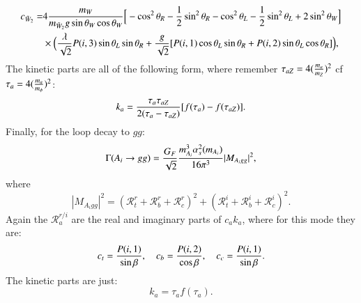 \documentclass[final,3p,times]{elsarticle}
\begin{document}
\begin{equation}
\begin{aligned}
c_{\tilde{W}_2} = & 4{m_{W} \over m_{\tilde{W}_2} g \sin\theta_W \cos\theta_W}\Big[-\cos^2 \theta_R - {1 \over 2}\sin^2 \theta_R - \cos^2 \theta_L - {1 \over 2}\sin^2 \theta_L + 2\sin^2 \theta_W\Big] \\ & \times \Big({\lambda \over \sqrt{2}}P(i,3)\sin\theta_L \sin\theta_R + {g \over \sqrt{2}}[P(i,1)\cos\theta_L \sin\theta_R + P(i,2)\sin\theta_L \cos\theta_R]\Big),
\end{aligned}
\end{equation}
The kinetic parts are all of the following form, where remember $\tau_{aZ} = 4({m_{a} \over m_{Z}})^2$ cf $\tau_{a} = 4({m_{a} \over m_{\phi}})^2$:
\begin{equation}
k_{a} = {\tau_{a}\tau_{aZ} \over 2(\tau_{a} - \tau_{aZ})}[f(\tau_{a})-f(\tau_{aZ})].
\end{equation}
Finally, for the loop decay to $gg$:
\begin{equation} \label{AggNMSSM}
\Gamma(A_i \rightarrow g g) = {G_{F} \over \sqrt{2}} {m_{A_i}^3 \alpha_s^2(m_{A_i}) \over 16 \pi^3} |M_{A_i gg}|^2,
\end{equation}
where 
\begin{equation}
|M_{A_i gg}|^2 = (\mathcal{R}_{t}^{r} + \mathcal{R}_{b}^{r} + \mathcal{R}_{c}^{r})^2 + (\mathcal{R}_{t}^{i} + \mathcal{R}_{b}^{i} + \mathcal{R}_{c}^{i})^2.
\end{equation}
Again the $\mathcal{R}_{a}^{r/i}$ are the real and imaginary parts of $c_{a}k_{a}$, where for this mode they are:
\begin{equation}
c_{t} = {P(i,1) \over \sin\beta}, \quad \quad \\
c_{b} = {P(i,2) \over \cos\beta}, \quad \quad \\
c_{c} = {P(i,1) \over \sin\beta}. \\
\end{equation}
The kinetic parts are just:
\begin{equation}
k_{a} = \tau_{a} f({\tau_a}).
\end{equation}
\end{document}
